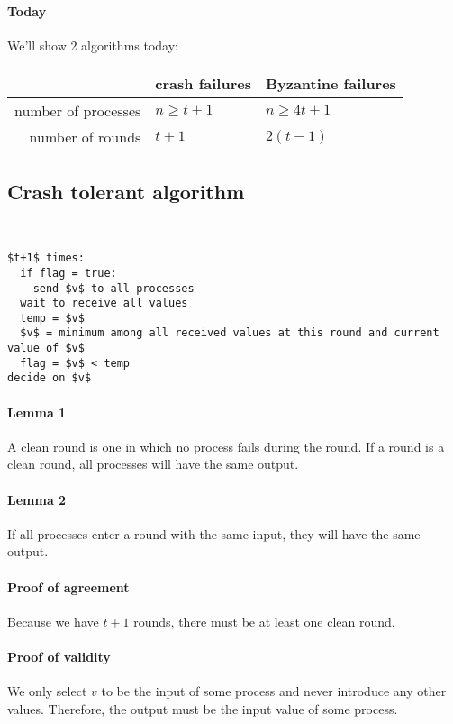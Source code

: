 \documentclass{idc_msc}
\begin{document}
\paragraph{Today}

We'll show 2 algorithms today:

\begin{tabu} to \linewidth{|r|l|l|}
\hline
 & crash failures & Byzantine failures \\
\hline
number of processes & $n \ge t + 1$ & $n \ge 4t +1$ \\
\hline
number of rounds & $t + 1$ & $2(t - 1)$ \\
\hline
\end{tabu}

\subsection{Crash tolerant algorithm}\ \\

\begin{lstlisting}[frame=L,mathescape=true,title={Algorithm for process $p_i$ with input $in_i$}]
$t+1$ times:
  if flag = true:
    send $v$ to all processes
  wait to receive all values
  temp = $v$
  $v$ = minimum among all received values at this round and current value of $v$
  flag = $v$ < temp
decide on $v$
\end{lstlisting}

\paragraph{Lemma 1}
A clean round is one in which no process fails during the round.
If a round is a clean round, all processes will have the same output.

\paragraph{Lemma 2}
If all processes enter a round with the same input, they will have the same output.

\paragraph{Proof of agreement}
Because we have $t+1$ rounds, there must be at least one clean round.

\paragraph{Proof of validity}
We only select $v$ to be the input of some process and never introduce any other values.
Therefore, the output must be the input value of some process.
\end{document}
